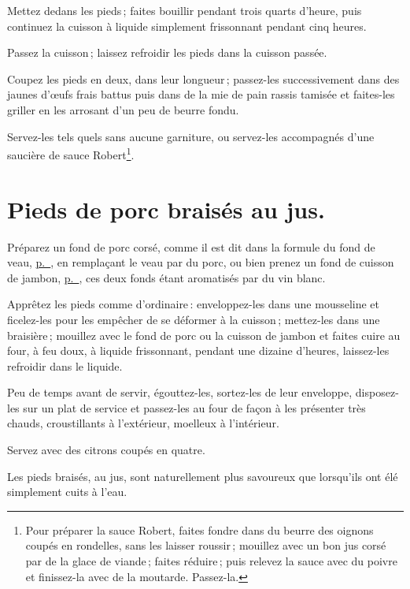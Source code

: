 Mettez dedans les pieds ; faites bouillir pendant trois quarts d'heure, puis
continuez la cuisson à liquide simplement frissonnant pendant cinq heures.

Passez la cuisson ; laissez refroidir les pieds dans la cuisson passée.

Coupez les pieds en deux, dans leur longueur ; passez-les successivement dans
des jaunes d'œufs frais battus puis dans de la mie de pain rassis tamisée et
faites-les griller en les arrosant d'un peu de beurre fondu.

Servez-les tels quels sans aucune garniture, ou servez-les accompagnés d'une
saucière de sauce Robert\footnote{Pour préparer la sauce Robert, faites fondre
dans du beurre des oignons coupés en rondelles, sans les laisser roussir ;
mouillez avec un bon jus corsé par de la glace de viande ; faites réduire ;
puis relevez la sauce avec du poivre et finissez-la avec de la moutarde.
Passez-la.}.

\section*{\centering Pieds de porc braisés au jus.}
{}
Préparez un fond de porc corsé, comme il est dit dans la formule du fond de
veau, \hyperlink{p0426}{p. \pageref{pg0426}}, en remplaçant le veau par du porc,
ou bien prenez un fond de cuisson de jambon,
\hyperlink{p0537}{p. \pageref{pg0537}}, ces deux fonds étant aromatisés par du vin
blanc.

Apprêtez les pieds comme d'ordinaire : enveloppez-les dans une mousseline et
ficelez-les pour les empêcher de se déformer à la cuisson ; mettez-les dans une
braisière ; mouillez avec le fond de porc ou la cuisson de jambon et faites
cuire au four, à feu doux, à liquide frissonnant, pendant une dizaine d'heures,
laissez-les refroidir dans le liquide.

Peu de temps avant de servir, égouttez-les, sortez-les de leur enveloppe,
disposez-les sur un plat de service et passez-les au four de façon à les
présenter très chauds, croustillants à l'extérieur, moelleux à l'intérieur.

Servez avec des citrons coupés en quatre.

\sk

Les pieds braisés, au jus, sont naturellement plus savoureux que lorsqu'ils ont
élé simplement cuits à l'eau.


